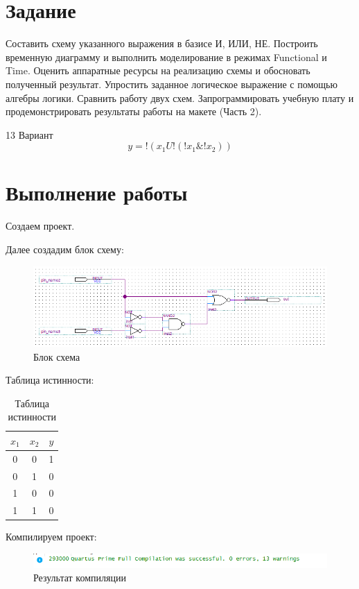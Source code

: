 \documentclass[a4paper,14pt]{article}
\begin{document}

\tableofcontents
\pagebreak

\section{Задание}

Составить схему указанного выражения в базисе И, ИЛИ, НЕ.
Построить временную диаграмму и выполнить моделирование в режимах
Functional и Time. Оценить аппаратные ресурсы на реализацию схемы и
обосновать полученный результат. Упростить заданное логическое
выражение с помощью алгебры логики. Сравнить работу двух схем.
Запрограммировать учебную плату и продемонстрировать результаты
работы на макете (Часть 2).

13 Вариант
$$y =  !(x_1 U !(!x_1 \& !x_2))$$

\section{Выполнение работы}

Создаем проект.

Далее создадим блок схему:

\begin{figure}[H]
	\centering
	\includegraphics[width=0.7\linewidth]{image/01_01}
	\caption{Блок схема}
	\label{fig:0101}
\end{figure}

Таблица истинности:

\begin{table}[H]
	\caption{Таблица истинности}
	\centering
	\begin{tabular}{|c|c|c|}
		\hline
		$x_1$ & $x_2$ & $y$ \\ \hline
		0    & 0    & 1 \\ \hline
		0    & 1    & 0 \\ \hline
		1    & 0    & 0 \\ \hline
		1    & 1    & 0 \\ \hline
	\end{tabular}
\end{table}

Компилируем проект:

\begin{figure}[H]
	\centering
	\includegraphics[width=0.7\linewidth]{image/01_02}
	\caption{Результат компиляции}
	\label{fig:0102}
\end{figure}
\end{document}
